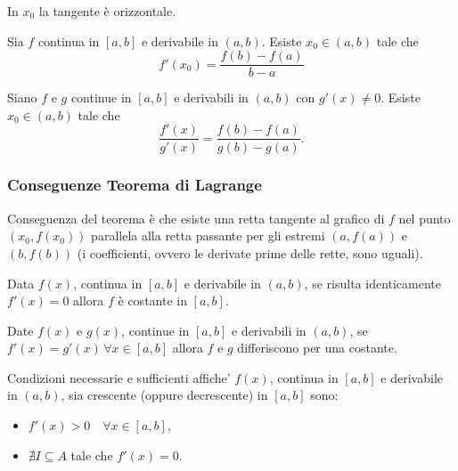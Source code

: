 \begin{remark}
    In $x_0$ la tangente è orizzontale.
\end{remark}

\begin{theorem}[Lagrange]\label{th:lagrange_analisi1}
    Sia $f$ continua in $[a,b]$ e derivabile in $(a,b)$. Esiste $x_0\in(a,b)$ tale che
    \begin{equation*}
        f'(x_0)=\frac{f(b)-f(a)}{b-a}
    \end{equation*}
\end{theorem}

\begin{theorem}[Cauchy]
    Siano $f$ e $g$ continue in $[a,b]$ e derivabili in $(a,b)$ con $g'(x)\neq 0$. Esiste $x_0\in(a,b)$ tale che
    \begin{equation*}
        \frac{f'(x)}{g'(x)}=\frac{f(b)-f(a)}{g(b)-g(a)}.
    \end{equation*}
\end{theorem}

\subsubsection{Conseguenze Teorema di Lagrange}

\begin{remark}
    Conseguenza del teorema è che esiste una retta tangente al grafico di $f$ nel punto $(x_0, f(x_0))$ parallela alla retta passante per gli estremi $(a,f(a))$ e $(b, f(b))$ (i coefficienti, ovvero le derivate prime delle rette, sono uguali).
\end{remark}

\begin{theorem}
    Data $f(x)$, continua in $[a,b]$ e derivabile in $(a,b)$, se risulta identicamente $f'(x)=0$ allora $f$ è costante in $[a,b]$.
\end{theorem}

\begin{theorem}
    Date $f(x)$ e $g(x)$, continue in $[a,b]$ e derivabili in $(a,b)$, se $f'(x)=g'(x)\,\forall x\in[a,b]$ allora $f$ e $g$ differiscono per una costante. 
\end{theorem}

\begin{theorem}
    Condizioni necessarie e sufficienti affiche' $f(x)$, continua in $[a,b]$ e derivabile in $(a,b)$, sia crescente (oppure decrescente) in $[a,b]$ sono:
    \begin{itemize}
        \item $f'(x)> 0\quad \forall x\in[a,b]$,
        \item $\nexists I\subseteq A$ tale che $f'(x)=0$. 
    \end{itemize}
\end{theorem}


